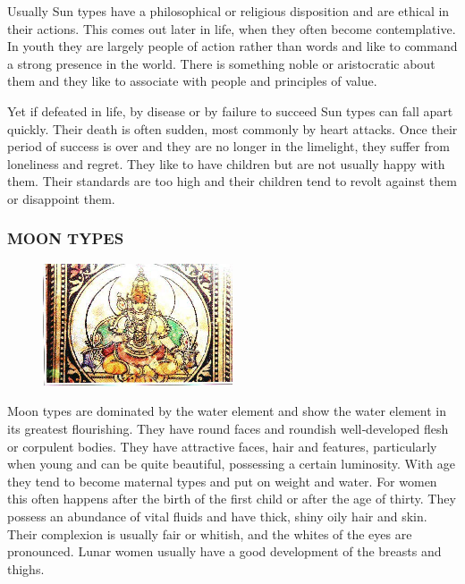 

Usually Sun types have a philosophical or religious disposition and are ethical in their actions. This comes out later in life, when they often become contemplative. In youth they are largely people of action rather than words and like to command a strong presence in the world. There is something noble or aristocratic about them and they like to associate with people and principles of value.

 

Yet if defeated in life, by disease or by failure to succeed Sun types can fall apart quickly. Their death is often sudden, most commonly by heart attacks. Once their period of success is over and they are no longer in the limelight, they suffer from loneliness and regret. They like to have children but are not usually happy with them. Their standards are too high and their children tend to revolt against them or disappoint them.

 



\subsubsection{MOON TYPES }
 
 
  \begin{figure}[H]
 \centering
\includegraphics[width=0.5\textwidth]{pics/Moon_type.png}
 \end{figure}
 

Moon types are dominated by the water element and show the water element in its greatest flourishing. They have round faces and roundish well‑developed flesh or corpulent bodies. They have attractive faces, hair and features, particularly when young and can be quite beautiful, possessing a certain luminosity. With age they tend to become maternal types and put on weight and water. For women this often happens after the birth of the first child or after the age of thirty. They possess an abundance of vital fluids and have thick, shiny oily hair and skin. Their complexion is usually fair or whitish, and the whites of the eyes are pronounced. Lunar women usually have a good development of the breasts and thighs.

